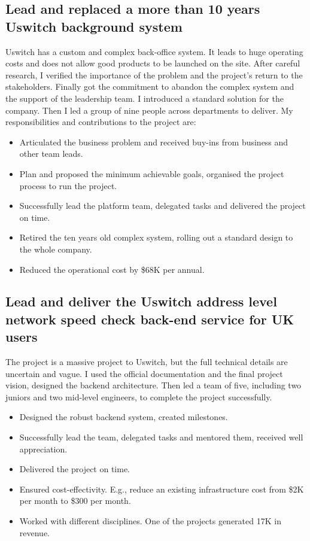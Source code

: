 \documentclass[a4paper]{twentysecondcv-english} %
\begin{document}
\subsection{Lead and replaced a more than 10 years Uswitch background system}

Uswitch has a custom and complex back-office system. It leads to huge operating costs and does not allow good products to be launched on the site. After careful research, I verified the importance of the problem and the project's return to the stakeholders. Finally got the commitment to abandon the complex system and the support of the leadership team. I introduced a standard solution for the company. Then I led a group of nine people across departments to deliver. My responsibilities and contributions to the project are:
\begin{itemize}
    \item Articulated the business problem and received buy-ins from business and other team leads.
    \item Plan and proposed the minimum achievable goals, organised the project process to run the project.
    \item Successfully lead the platform team, delegated tasks and delivered the project on time.
    \item Retired the ten years old complex system, rolling out a standard design to the whole company.
    \item Reduced the operational cost by \$68K per annual.
\end{itemize}

\newpage %
\makesidebar

\subsection{Lead and deliver the Uswitch address level network speed check back-end service for UK users}

The project is a massive project to Uswitch, but the full technical details are uncertain and vague. I used the official documentation and the final project vision, designed the backend architecture. Then led a team of five, including two juniors and two mid-level engineers, to complete the project successfully.

\begin{itemize}
    \item Designed the robust backend system, created milestones.
    \item Successfully lead the team, delegated tasks and mentored them, received well appreciation.
    \item Delivered the project on time.
    \item Ensured cost-effectivity. E.g., reduce an existing infrastructure cost from \$2K per month to \$300 per month.
    \item Worked with different disciplines. One of the projects generated \textsterling17K in revenue.
\end{itemize}
\end{document}

